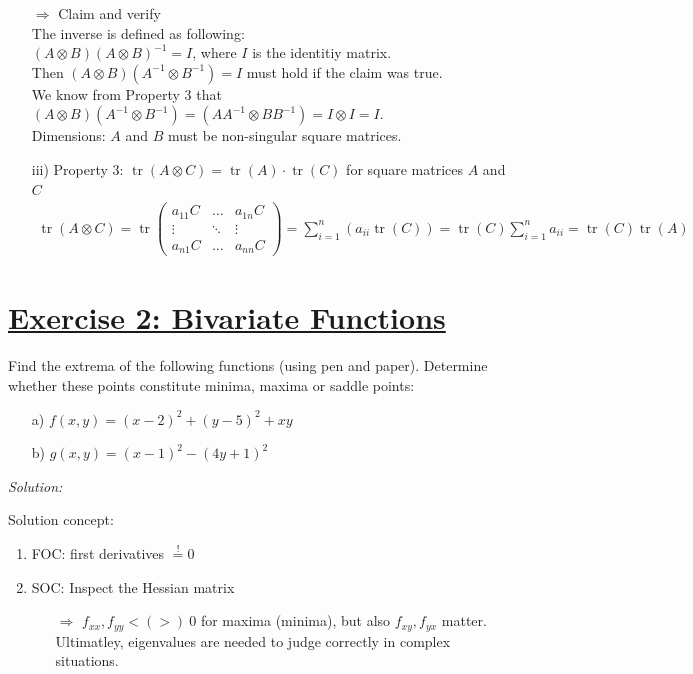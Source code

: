 \documentclass[12pt,a4paper]{article}
\newcommand{\tr}{\operatorname{tr}}
\newcommand{\tmpsection}[1]{}
\let\tmpsection=\section
\renewcommand{\section}[1]{\tmpsection{\underline{#1}} }
\begin{document}
\begin{itemize}
    $\Rightarrow$ Claim and verify \\
    The inverse is defined as following: \\
    $(A \otimes B)(A \otimes B)^{-1} = I$, where $I$ is the identitiy matrix.\\
    Then $(A \otimes B)(A^{-1} \otimes B^{-1}) = I$ must hold if the claim was true.\\
    We know from Property 3 that $(A \otimes B)(A^{-1} \otimes B^{-1}) = (AA^{-1} \otimes BB^{-1}) =  I \otimes I = I$. \\
    Dimensions: $A$ and $B$ must be non-singular square matrices.
    \item[iii)] Property 3: $\tr(A \otimes C ) = \tr(A) \cdot \tr( C)$ for square matrices $A$ and $C$
    \begin{align*}
      \tr(A \otimes C) = 
      \tr 
      \begin{pmatrix}
        a_{11}C & \ldots & a_{1n}C \\
        \vdots & \ddots & \vdots \\
        a_{n1}C & \ldots & a_{nn}C
      \end{pmatrix}
      = \sum_{i = 1}^{n}\left( a_{ii} \tr(C) \right) = \tr(C) \sum_{i=1}^{n} a_{ii} = \tr(C) \tr(A)
    \end{align*}
\end{itemize}

\hypertarget{exercise-2-bivariate-functions}{%
\section{Exercise 2: Bivariate
Functions}\label{exercise-2-bivariate-functions}}

Find the extrema of the following functions (using pen and paper).
Determine whether these points constitute minima, maxima or saddle
points:

\begin{itemize}
    \item[a)] $f(x,y) = (x -2)^2 + (y -5)^2 + xy$
    \item[b)] $g(x,y) = (x -1)^2 - (4y + 1)^2$
\end{itemize}

\emph{Solution:}

Solution concept:

\begin{enumerate}
    \item FOC: first derivatives $\overset{!}{=} 0$
    \item SOC: Inspect the Hessian matrix
    \begin{itemize}
      \item[$\Rightarrow$] $f_{xx}, f_{yy} < (>) \ 0$ for maxima (minima), but also $f_{xy}, f_{yx}$ matter. Ultimatley, eigenvalues are needed to judge correctly in complex situations. 
    \end{itemize}
\end{enumerate}
\end{document}
